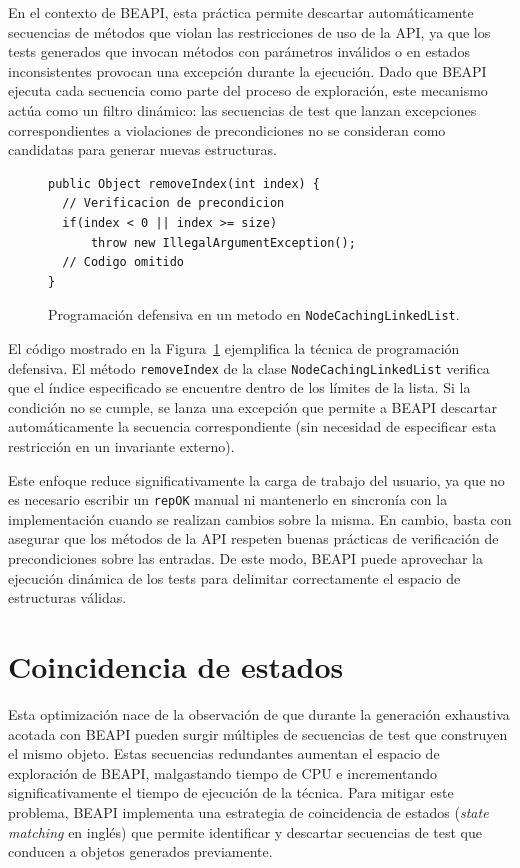 En el contexto de \textsf{BEAPI}, esta práctica permite descartar automáticamente secuencias de métodos que violan las restricciones de uso 
de la API, ya que los tests generados que invocan métodos con parámetros inválidos o en estados inconsistentes provocan una excepción 
durante la ejecución. Dado que \textsf{BEAPI} ejecuta cada secuencia como parte del proceso de exploración, este mecanismo actúa 
como un filtro dinámico: las secuencias de test que lanzan excepciones correspondientes
a violaciones de precondiciones no se consideran como candidatas para generar nuevas estructuras.

\begin{figure}[!htb]
\begin{lstlisting}
public Object removeIndex(int index) {
  // Verificacion de precondicion
  if(index < 0 || index >= size)
      throw new IllegalArgumentException();  
  // Codigo omitido
}
\end{lstlisting}
\caption{Programación defensiva en un metodo en \texttt{NodeCachingLinkedList}.}
\label{fig:algoProgDefensiva}
\end{figure}

El código mostrado en la Figura~\ref{fig:algoProgDefensiva} ejemplifica la
técnica de programación defensiva. 
El método \texttt{removeIndex} de la clase \texttt{NodeCachingLinkedList} verifica que el índice especificado se encuentre dentro de los límites de la lista. 
Si la condición no se cumple, se lanza una excepción que permite a
\textsf{BEAPI} descartar automáticamente la secuencia correspondiente (sin
necesidad de especificar esta restricción en un invariante externo).

Este enfoque reduce significativamente la carga de trabajo del usuario, ya que no es necesario escribir un \texttt{repOK} manual ni mantenerlo 
en sincronía con la implementación cuando se realizan cambios sobre la misma. En
cambio, basta con asegurar que los métodos de la API respeten buenas prácticas
de verificación de precondiciones sobre las entradas. 
De este modo, \textsf{BEAPI} puede aprovechar la ejecución dinámica de los tests para delimitar correctamente el espacio de estructuras válidas.


\section{Coincidencia de estados}
\label{sec:stateMatching}
Esta optimización nace de la observación de que durante la generación exhaustiva
acotada con \textsf{BEAPI} pueden surgir múltiples de secuencias de test que
construyen el mismo objeto. 
Estas secuencias redundantes aumentan el espacio de exploración
de \textsf{BEAPI}, malgastando tiempo de CPU e incrementando significativamente el 
tiempo de ejecución de la técnica. 
Para mitigar este problema, \textsf{BEAPI} implementa una estrategia de
coincidencia de estados (\emph{state matching} en inglés) que permite
identificar y descartar secuencias de test que conducen a objetos generados
previamente.

